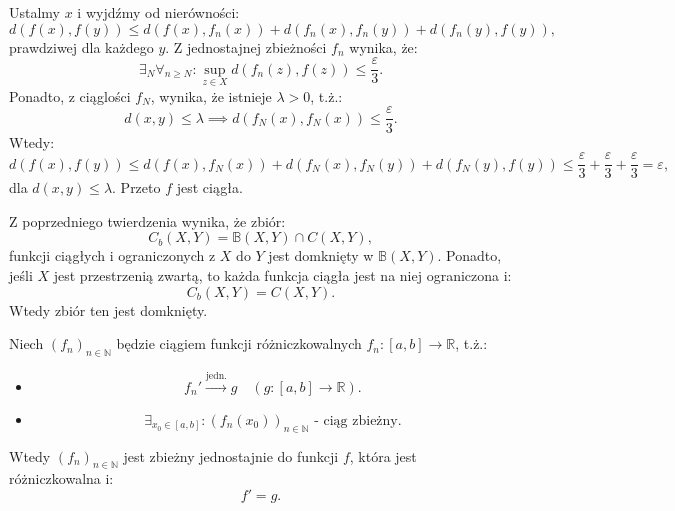 \documentclass{article}
\numberwithin{defi}{section}
\numberwithin{defi}{section}
\newcommand{\R}{\mathbb{R}}
\newcommand{\N}{\mathbb{N}}
\newcommand{\B}{\mathbb{B}}
\providecommand{\eps}{\varepsilon}
\renewcommand{\geq}{\geqslant}
\renewcommand{\leq}{\leqslant}
\newcommand{\ciag}[1]{(#1_{n})_{n \in \N}}
\newcommand{\tojedn}{\xrightarrow{\text{jedn.}}}
\begin{document}
\begin{dow}{}
    Ustalmy $x$ i wyjdźmy od nierówności: \begin{equation}
        d(f(x), f(y)) \leq d(f(x), f_n(x)) + d(f_n(x), f_n(y)) + d(f_n(y), f(y)),
    \end{equation} prawdziwej dla każdego $y$. Z jednostajnej zbieżności $f_n$ wynika, że: \begin{equation*}
        \exists_{N} \forall_{ n \geq N}: \sup_{z \in X} d(f_n(z), f(z)) \leq \frac{\eps}{3}.
    \end{equation*} Ponadto, z ciąglości $f_N$, wynika, że istnieje $\lambda > 0$, t.ż.: \begin{equation*}
        d(x, y) \leq \lambda \implies d(f_N(x), f_N(x)) \leq \frac{\eps}{3}.
    \end{equation*} Wtedy: \begin{equation*}
        d(f(x), f(y)) \leq d(f(x), f_N(x)) + d(f_N(x), f_N(y)) + d(f_N(y), f(y)) \leq \frac{\eps}{3} + \frac{\eps}{3} + \frac{\eps}{3} = \eps,
    \end{equation*} dla $d(x, y) \leq \lambda$. Przeto $f$ jest ciągła.
\end{dow}

\begin{obs}{}
    Z poprzedniego twierdzenia wynika, że zbiór: \begin{equation*}
        C_b(X, Y) = \B(X, Y) \cap C(X, Y),
    \end{equation*} funkcji ciągłych i ograniczonych z $X$ do $Y$ jest domknięty w $\B(X, Y)$. Ponadto, jeśli $X$ jest przestrzenią zwartą, to każda funkcja ciągła jest na niej ograniczona i: \begin{equation*}
        C_b(X, Y) = C(X, Y).
    \end{equation*} Wtedy zbiór ten jest domknięty.
\end{obs}

\begin{twier}{}
    Niech $\ciag{f}$ będzie ciągiem funkcji różniczkowalnych $f_n: [a, b] \to \R$, t.ż.: \begin{itemize}
        \item \begin{equation}
            f_n' \tojedn g \quad (g: [a, b] \to \R).
        \end{equation}
        \item \begin{equation}
            \exists_{x_0 \in [a, b]}: (f_n(x_0))_{n \in \N} \text{ - ciąg zbieżny.}
        \end{equation}
    \end{itemize}
    Wtedy $\ciag{f}$ jest zbieżny jednostajnie do funkcji $f$, która jest różniczkowalna i: \begin{equation}
        f' = g.
    \end{equation}
\end{twier}
\end{document}
